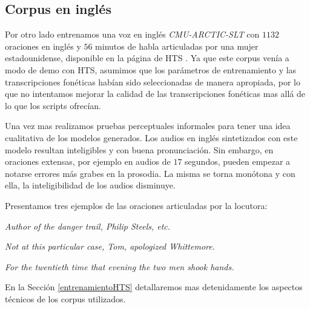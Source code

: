 
\subsection{Corpus en inglés}

Por otro lado entrenamos una voz en inglés \textit{CMU-ARCTIC-SLT} \cite{cmuArtic} con $1132$ oraciones en inglés y $56$ minutos de habla articuladas por una mujer estadounidense, disponible en la página de HTS \cite{hts}. Ya que este corpus venía a modo de demo con HTS, asumimos que los parámetros de entrenamiento y las transcripciones fonéticas habían sido seleccionadas de manera apropiada, por lo que no intentamos mejorar la calidad de las transcripciones fonéticas mas allá de lo que los scripts ofrecían. 

Una vez mas realizamos pruebas perceptuales informales para tener una idea cualitativa de los modelos generados. Los audios en inglés sintetizados con este modelo resultan inteligibles y con buena pronunciación. Sin embargo, en oraciones extensas, por ejemplo en audios de $17$ segundos, pueden empezar a notarse errores más grabes en la prosodia. La misma se torna monótona y con ella, la inteligibilidad de los audios disminuye.

Presentamos tres ejemplos de las oraciones articuladas por la locutora:

\indent\indent \textit{Author of the danger trail, Philip Steels, etc.}

\indent\indent \textit{Not at this particular case, Tom, apologized Whittemore.}

\indent\indent \textit{For the twentieth time that evening the two men shook hands.}

En la Sección \ref{entrenamientoHTS} detallaremos mas detenidamente los aspectos técnicos de los corpus utilizados.

